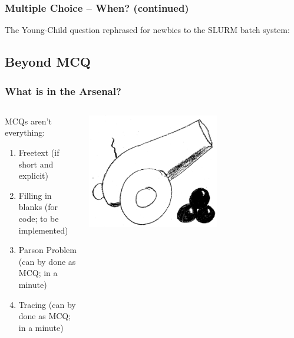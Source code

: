 \begin{frame}
 \frametitle{Multiple Choice -- When? (continued)}
 
 The Young-Child question rephrased for newbies to the SLURM batch system:
 \vspace{-1em}
\end{frame}

\subsection{Beyond MCQ}

\begin{frame}
  \frametitle{What is in the Arsenal?}
  \begin{columns}
   \begin{column}{.5\textwidth}
    MCQs aren't everything:
     \begin{enumerate}
      \item Freetext (if short and explicit)
      \item Filling in blanks (for code; to be implemented)
      \item Parson Problem (can by done as MCQ; in a minute)
      \item Tracing (can by done as MCQ; in a minute)
     \end{enumerate}
   \end{column}
   \begin{column}{.5\textwidth}
       \centering
      \includegraphics[width=0.6\textwidth]{images/arsenal}
    \end{column}
  \end{columns}
\end{frame}

